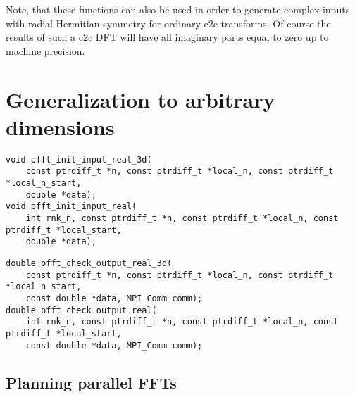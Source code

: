 Note, that these functions can also be used in order to generate complex inputs with radial Hermitian symmetry for ordinary c2c transforms. 
Of course the results of such a c2c DFT will have all imaginary parts equal to zero up to machine precision.










\section{Generalization to arbitrary dimensions}

\begin{lstlisting}
void pfft_init_input_real_3d(
    const ptrdiff_t *n, const ptrdiff_t *local_n, const ptrdiff_t *local_n_start,
    double *data);
void pfft_init_input_real(
    int rnk_n, const ptrdiff_t *n, const ptrdiff_t *local_n, const ptrdiff_t *local_start,
    double *data);
\end{lstlisting}

\begin{lstlisting}
double pfft_check_output_real_3d(
    const ptrdiff_t *n, const ptrdiff_t *local_n, const ptrdiff_t *local_n_start,
    const double *data, MPI_Comm comm);
double pfft_check_output_real(
    int rnk_n, const ptrdiff_t *n, const ptrdiff_t *local_n, const ptrdiff_t *local_start,
    const double *data, MPI_Comm comm);
\end{lstlisting}


\subsection{Planning parallel FFTs}

